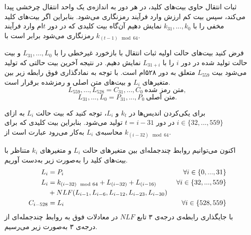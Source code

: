 ثبات انتقال  حاوی بیت‌های کلید، در هر دور به اندازه‌ی یک واحد انتقال  چرخشی پیدا می‌کند،  سپس بیت کم ارزش وارد فرآیند رمزنگاری می‌شود. بنابراین اگر بیت‌های کلید مخفی را با 
$k_{31},...,k_{0}$
نمایش دهیم آن‌گاه بیت کلیدی که در دور 
$t$ام
 وارد فرآیند رمزنگاری می‌شود برابر است با 
$k_{(t - 1)\mod 64}$.


فرض کنید بیت‌های حالت اولیه‌  ثبات انتقال با بازخورد غیرخطی  را با 
$L_{31},...,L_{0}$
و بیت‌ حالت تولید شده در دور 
$i$
را با 
$L_{31 + i}$
نمایش  ‌دهیم. در نتیجه آخرین بیت حالتی که تولید می‌شود بیت 
$L_{559}$
متعلق به دور ۵۲۸ام است. با توجه به نمادگذاری فوق رابطه‌  زیر بین متغیر‌های 
$L_{i}$
و بیت‌های متن اصلی و رمزشده برقرار است. 
$$L_{559},...,L_{528} = C_{31},...,C_{0} \ \text{متن رمز شده},$$
$$L_{31},...,L_{0} = P_{31},...,P_{0} \ \text{متن اصلی}.$$

برای یکی‌کردن اندیس‌‌ها در 
$k_{t}$
و
$L_{i}$، 
توجه کنید که بیت حالت 
$L_{i}$
به ازای 
{\small $i\in \{32,...,559\}$}
در دور 
$t = i - 31$
تولید می‌شود. بنابراین بیت کلیدی که برای محاسبه‌ی 
$L_{i}$
به‌کار می‌رود عبارت است از 
{\small $k_{(i - 32)\mod 64}$.}

اکنون می‌توانیم  روابط چندجمله‌ای بین متغیرهای حالت 
$L_{i}$
و متغیرهای 
$k_{i}$
متناظر با بیت‌های کلید را به‌صورت زیر به‌دست آوریم. 
\begin{align*}
\label{keloq eq1}
L_{i} &= P_{i}  \  &\fa i\in \{0,...,31\}\\
L_{i} &= k_{(i - 32)\mod 64} + L_{(i - 32)} + L_{(i - 16)} \ &\fa i\in\{32,...,559\}\\
 \ &+NLF(L_{i-1}, L_{i - 6},L_{i-12},  L_{i - 23}, L_{i - 30}) \ & \\
C_{i - 528} &= L_{i} \ &\fa i\in \{528, 559\}
\end{align*}
با جایگذاری رابطه‌ی درجه‌ی ۳ تابع 
$NLF$
در معادلات فوق به روابط  چندجمله‌ای از درجه‌ی ۳ به‌صورت زیر می‌رسیم. 

